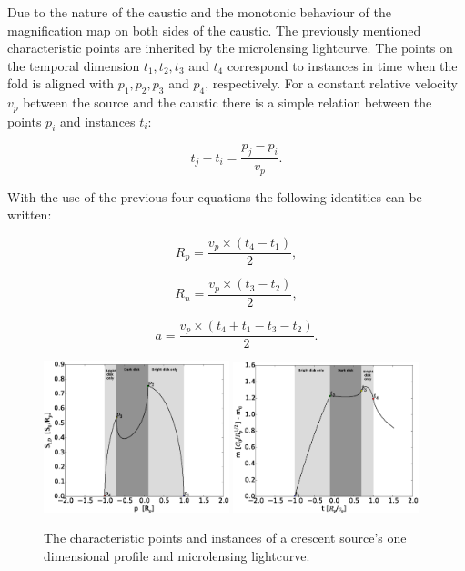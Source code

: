 \documentclass[usenatbib]{mn2e}
\begin{document}
Due to the nature of the caustic and the monotonic behaviour of the magnification map on both sides of the caustic. The previously mentioned characteristic points are inherited by the microlensing lightcurve. The points on the temporal dimension $t_1, t_2, t_3$ and $t_4$ correspond to instances in time when the fold is aligned with $p_1, p_2, p_3$ and $p_4$, respectively. For a constant relative velocity $v_p$ between the source and the caustic there is a simple relation between the points $p_i$ and instances $t_i$:

\begin{equation}
    t_j - t_i = \frac{p_j - p_i}{v_p}.
\end{equation}

With the use of the previous four equations the following identities can be written:

\begin{equation}
    R_p = \frac{v_p \times  \left( t_4 -t_1 \right)}{2}, 
\end{equation}

\begin{equation}
        R_n = \frac{v_p \times \left( t_3 -t_2 \right)}{2}, 
\end{equation}

\begin{equation}
        a = \frac{v_p \times \left( t_4 +t_1 - t_3 - t_2 \right)}{2}. 
\end{equation}


\begin{figure}
\centering
	\includegraphics[width = 0.48\textwidth]{figures/ch_points.eps}
        \includegraphics[width = 0.48\textwidth]{figures/ch_instances.eps}
\caption{\label{fig:char_points} The characteristic points and instances of a crescent source's one dimensional profile and microlensing lightcurve. }
\end{figure}
\end{document}
